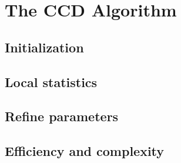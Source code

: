 \chapter{The CCD Algorithm}
\label{chapter:ccd}

\section{Initialization}
\label{sec:init}

\section{Local statistics}
\label{sec:ls}

\section{Refine parameters}
\label{sec:ref}

\section{Efficiency and complexity}
\label{sec:eff}



